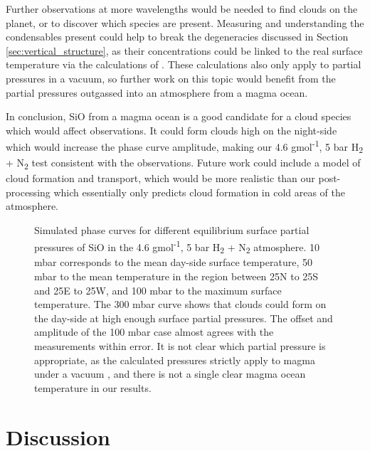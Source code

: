 Further observations at more wavelengths would be needed to find clouds on the planet, or to discover which species are present. Measuring and understanding the condensables present could help to break the degeneracies discussed in Section \ref{sec:vertical_structure}, as their concentrations could be linked to the real surface temperature via the calculations of \citet{miguel2011compositions}. These calculations also only apply to partial pressures in a vacuum, so further work on this topic would benefit from the partial pressures outgassed into an atmosphere from a magma ocean.

In conclusion, SiO from a magma ocean is a good candidate for a cloud species which would affect observations. It could form clouds high on the night-side which would increase the phase curve amplitude, making our 4.6 gmol\textsuperscript{-1}, 5 bar H\textsubscript{2} + N\textsubscript{2} test consistent with the observations. Future work could include a model of cloud formation and transport, which would be more realistic than our post-processing which essentially only predicts cloud formation in cold areas of the atmosphere.

\begin{figure}
\caption{Simulated phase curves for different equilibrium surface partial pressures of SiO in the 4.6 gmol\textsuperscript{-1}, 5 bar H\textsubscript{2} + N\textsubscript{2} atmosphere. 10 mbar corresponds to the mean day-side surface temperature, 50 mbar to the mean temperature in the region between 25N to 25S and 25E to 25W, and 100 mbar to the maximum surface temperature. The 300 mbar curve shows that clouds could form on the day-side at high enough surface partial pressures.  The offset and amplitude of the 100 mbar case almost agrees with the \citet{demory2016map} measurements within error. It is not clear which partial pressure is appropriate, as the calculated pressures strictly apply to magma under a vacuum \citep{miguel2011compositions}, and there is not a single clear magma ocean temperature in our results. \label{fig:phasecurves_clouds}}
\end{figure}







\section{Discussion}

